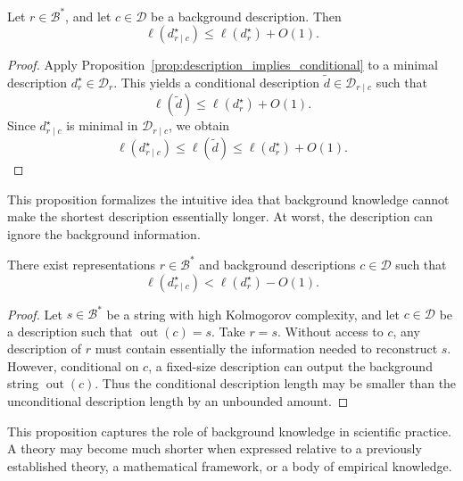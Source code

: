 \begin{proposition}
\label{prop:description_conditional_inequality}
Let \(r\in\mathcal B^\ast\), and let \(c\in\mathcal D\) be a background
description. Then
\[
\ell(d^\star_{r\mid c})
\leq
\ell(d^\star_r)+O(1).
\]
\end{proposition}

\begin{proof}
Apply Proposition~\ref{prop:description_implies_conditional} to a minimal
description \(d^\star_r\in\mathcal D_r\). This yields a conditional description
\(\widetilde d\in\mathcal D_{r\mid c}\) such that
\[
\ell(\widetilde d)\leq \ell(d^\star_r)+O(1).
\]
Since \(d^\star_{r\mid c}\) is minimal in \(\mathcal D_{r\mid c}\), we obtain
\[
\ell(d^\star_{r\mid c})
\leq
\ell(\widetilde d)
\leq
\ell(d^\star_r)+O(1).
\]
\end{proof}

This proposition formalizes the intuitive idea that background knowledge cannot
make the shortest description essentially longer. At worst, the description can
ignore the background information.

\begin{proposition}
\label{prop:conditioning_can_reduce_length}
There exist representations \(r\in\mathcal B^\ast\) and background descriptions
\(c\in\mathcal D\) such that
\[
\ell(d^\star_{r\mid c})
<
\ell(d^\star_r)-O(1).
\]
\end{proposition}

\begin{proof}
Let \(s\in\mathcal B^\ast\) be a string with high Kolmogorov complexity, and
let \(c\in\mathcal D\) be a description such that \(\operatorname{out}(c)=s\).
Take \(r=s\). Without access to \(c\), any description of \(r\) must contain
essentially the information needed to reconstruct \(s\). However, conditional
on \(c\), a fixed-size description can output the background string
\(\operatorname{out}(c)\). Thus the conditional description length may be
smaller than the unconditional description length by an unbounded amount.
\end{proof}

This proposition captures the role of background knowledge in scientific
practice. A theory may become much shorter when expressed relative to a
previously established theory, a mathematical framework, or a body of empirical
knowledge.

